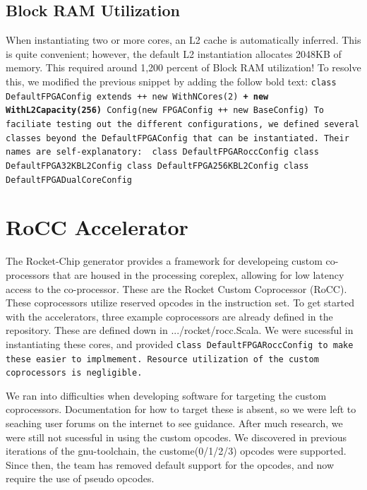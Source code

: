 \documentclass[journal]{IEEEtran}
\begin{document}
\subsection{Block RAM Utilization}
When instantiating two or more cores, an L2 cache is automatically inferred. This is quite convenient; however, the default L2 instantiation allocates 2048KB of memory. This required around 1,200 percent of Block RAM utilization! To resolve this, we modified the previous snippet by adding the follow bold text:
\newline
\newline
\tt{class DefaultFPGAConfig extends ++ new WithNCores(2) \textbf{+ new WithL2Capacity(256)} Config(new FPGAConfig ++ new BaseConfig)}\rm{}
\newline
\newline
To faciliate testing out the different configurations, we defined several classes beyond the \tt{DefaultFPGAConfig}\rm{} that can be instantiated. Their names are self-explanatory:
\newline
\newline
\tt{
class DefaultFPGARoccConfig \newline
class DefaultFPGA32KBL2Config \newline
class DefaultFPGA256KBL2Config \newline
class DefaultFPGADualCoreConfig}\rm{}

\section{RoCC Accelerator}
The Rocket-Chip generator provides a framework for developeing custom co-processors that are housed in the processing coreplex, allowing for low latency access to the co-processor. These are the Rocket Custom Coprocessor (RoCC). These coprocessors utilize reserved opcodes in the instruction set. To get started with the accelerators, three example coprocessors are already defined in the repository. These are defined down in .../rocket/rocc.Scala. We were sucessful in instantiating these cores, and provided \tt{class DefaultFPGARoccConfig}\rm{} to make these easier to implmement. Resource utilization of the custom coprocessors is negligible.

We ran into difficulties when developing software for targeting the custom coprocessors. Documentation for how to target these is absent, so we were left to seaching user forums on the internet to see guidance. After much research, we were still not sucessful in using the custom opcodes. We discovered in previous iterations of the gnu-toolchain, the custome(0/1/2/3) opcodes were supported. Since then, the team has removed default support for the opcodes, and now require the use of pseudo opcodes\cite{psuedocode}. 
\end{document}
